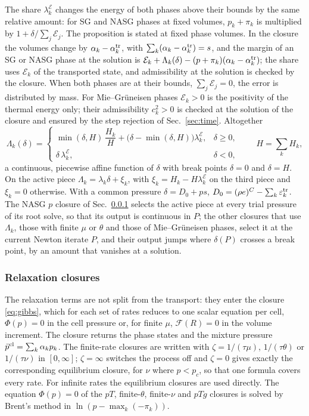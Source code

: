 The share $\lambda^{\mathcal E}_k$ changes the energy of both phases above their bounds by the same relative amount: for SG and NASG phases at
fixed volumes, $p_k+\pi_k$ is multiplied by $1+\delta/\sum_j\mathcal E_j$.
The proposition is stated at fixed phase volumes. In the closure the volumes change by $\alpha_k-\alpha^{\rm tr}_k$, with
$\sum_k(\alpha_k-\alpha^{\rm tr}_k)=s$, and the margin of an SG or NASG phase at the solution is
$\mathcal E_k+\Lambda_k(\delta)-(p+\pi_k)(\alpha_k-\alpha^{\rm tr}_k)$; the share uses $\mathcal E_k$ of the transported state, and
admissibility at the solution is checked by the closure. When both
phases are at their bounds, $\sum_j\mathcal E_j=0$, the error is distributed by mass. For Mie--Gr\"uneisen phases
$\mathcal E_k>0$ is the positivity of the thermal energy only; their admissibility $c_k^2>0$ is checked at the solution of the
closure and ensured by the step rejection of Sec.~\ref{sec:time}. Altogether
\begin{equation}
\Lambda_k(\delta)=\begin{cases}\min(\delta,H)\,\dfrac{H_k}{H}+\big(\delta-\min(\delta,H)\big)\lambda^{\mathcal E}_k,&\delta\ge0,\\[4pt]
\delta\,\lambda^{\mathcal E}_k,&\delta<0,\end{cases}\qquad H=\sum_kH_k ,
\label{eq:Lambda}
\end{equation}
a continuous, piecewise affine function of $\delta$ with break points $\delta=0$ and $\delta=H$. On the active piece
$\Lambda_k=\lambda_k\delta+\xi_k$, with $\xi_k=H_k-H\lambda^{\mathcal E}_k$ on the third piece and $\xi_k=0$ otherwise. With a common pressure
$\delta=D_0+ps$, $D_0=(\rho e)^C-\sum_k\varepsilon^{\rm tr}_k$. The NASG $p$ closure of Sec.~\ref{sec:relaxation} selects the active piece at every trial pressure of its
root solve, so that its output is continuous in $P$; the other closures that use $\Lambda_k$, those
with finite $\mu$ or $\theta$ and those of Mie--Gr\"uneisen phases, select it at the current Newton iterate $P$, and their output
jumps where $\delta(P)$ crosses a break point, by an amount that vanishes at a solution.

\subsubsection{Relaxation closures}
\label{sec:relaxation}
The relaxation terms are not split from the transport: they enter the closure \eqref{eq:gibbs}, which for each set of
rates reduces to one scalar equation per cell, $\Phi(p)=0$ in the cell pressure or, for finite $\mu$, $\mathcal F(R)=0$ in the
volume increment. The closure returns the phase states and the mixture pressure $\bar p^{\rm cl}=\sum_k\alpha_kp_k$. The finite-rate
closures are written with $\zeta=1/(\tau\mu)$, $1/(\tau\theta)$ or $1/(\tau\nu)$ in $[0,\infty]$; $\zeta=\infty$ switches the process off
and $\zeta=0$ gives exactly the corresponding equilibrium closure, for $\nu$ where $p<p_c$, so that one formula covers every
rate. For infinite rates the equilibrium closures are used directly. The equation $\Phi(p)=0$ of the $pT$, finite-$\theta$,
finite-$\nu$ and $pTg$ closures is solved by Brent's method in $\ln(p-\max_k(-\pi_k))$.

